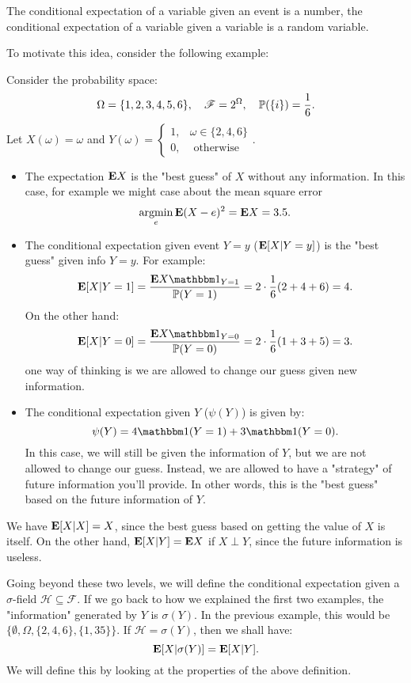 \documentclass[../main/main.tex]{subfiles}
\begin{document}
\begin{remark}
	The conditional expectation of a variable given an event is a number, the conditional expectation of a variable given a variable is a random variable.
\end{remark}
To motivate this idea, consider the following example:
\begin{example}
	Consider the probability space: \[
		\Omega = \{1, 2, 3, 4, 5, 6\}, \quad \mathscr{F} = 2^{\Omega}, \quad \P(\{i\}) = \frac{1}{6}.
	\] Let $X(\omega) = \omega$ and $Y(\omega) = \begin{cases}
			1 , & \omega \in \{2, 4, 6\} \\
			0,  & \text{ otherwise}
		\end{cases}$.
	\begin{itemize}
		\item The expectation $\E X$ is the "best guess" of $X$ without any information. In this case, for example we might case about the mean square error \[
			      \argmin_e \E (X-e)^2 = \E X = 3.5.
		      \]
		\item The conditional expectation given event $Y=y$ ($\E[X | Y=y]$) is the "best guess" given info $Y=y$. For example: \[
			      \E[X | Y=1] = \frac{\E X \ind_{Y = 1}}{\P(Y=1)} = 2 \cdot \frac{1}{6} ( 2+4+6) = 4.
		      \] On the other hand: \[
			      \E[X | Y=0] = \frac{\E X \ind_{Y = 0}}{\P(Y=0)} = 2 \cdot \frac{1}{6}(1 +3 +5) = 3.
		      \] one way of thinking is we are allowed to change our guess given new information.
		\item The conditional expectation given $Y$ ($\psi(Y)$) is given by: \[
			      \psi(Y) = 4 \ind (Y=1) + 3 \ind( Y=0).
		      \] In this case, we will still be given the information of $Y$, but we are not allowed to change our guess. Instead, we are allowed to have a "strategy" of future information you'll provide. In other words, this is the "best guess" based on the future information of $Y$.
	\end{itemize}
\end{example}
\begin{example}
	We have $\E[X | X] = X$, since the best guess based on getting the value of $X$ is itself. On the other hand, $\E[X | Y] = \E X$ if $X \perp Y$, since the future information is useless.
\end{example}
Going beyond these two levels, we will define the conditional expectation given a $\sigma$-field $\mathcal{H} \subseteq \mathscr{F}$. If we go back to how we explained the first two examples, the "information" generated by $Y$ is $\sigma(Y)$. In the previous example, this would be $\{\emptyset, \Omega, \{2,4,6\}, \{1,3 5\}\}$. If $\mathcal{H} = \sigma(Y)$, then we shall have: \[
	\E[X | \sigma(Y)] = \E[X | Y].
\] We will define this by looking at the properties of the above definition.
\end{document}
